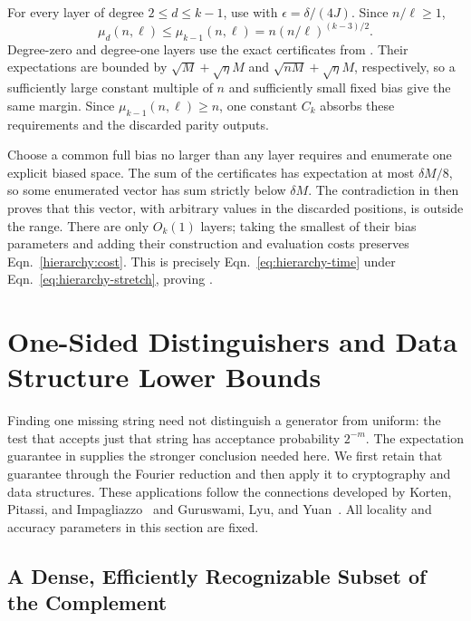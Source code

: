 \documentclass[letterpaper,11pt]{article}
\theoremstyle{definition}
\begin{document}
For every layer of degree $2\leq d\leq k-1$, use
 with $\epsilon=\delta/(4J)$.
Since $n/\ell\geq1$,
\[
 \mu_d(n,\ell)\leq\mu_{k-1}(n,\ell)
 =n(n/\ell)^{(k-3)/2}.
\]
Degree-zero and degree-one layers use the exact certificates from
. Their expectations are bounded by
$\sqrt M+\sqrt\eta M$ and $\sqrt{nM}+\sqrt\eta M$, respectively,
so a sufficiently large constant multiple of $n$ and sufficiently
small fixed bias give the same margin. Since
$\mu_{k-1}(n,\ell)\geq n$, one constant $C_k$ absorbs these
requirements and the discarded parity outputs.

Choose a common full bias no larger than any layer requires and
enumerate one explicit biased space. The sum of the certificates
has expectation at most $\delta M/8$, so some enumerated vector
has sum strictly below $\delta M$. The contradiction in
 then proves that this vector, with arbitrary
values in the discarded positions, is outside the range.
There are only $O_k(1)$ layers; taking the smallest of their bias
parameters and adding their construction and evaluation costs
preserves Eqn.~\eqref{hierarchy:cost}. This is precisely
Eqn.~\eqref{eq:hierarchy-time} under
Eqn.~\eqref{eq:hierarchy-stretch}, proving
.



\section{One-Sided Distinguishers and Data Structure Lower Bounds}
\label{sec:applications}

Finding one missing string need not distinguish a generator from uniform:
the test that accepts just that string has acceptance probability $2^{-m}$.
The expectation guarantee in  supplies the stronger
conclusion needed here. We first retain that guarantee through the
Fourier reduction and then apply it to cryptography and data structures.
These applications follow the connections developed by Korten, Pitassi,
and Impagliazzo~\cite{KPI25} and Guruswami, Lyu, and Yuan~\cite{GLY26}.
All locality and accuracy parameters in this section are fixed.

\subsection{A Dense, Efficiently Recognizable Subset of the Complement}
\end{document}
